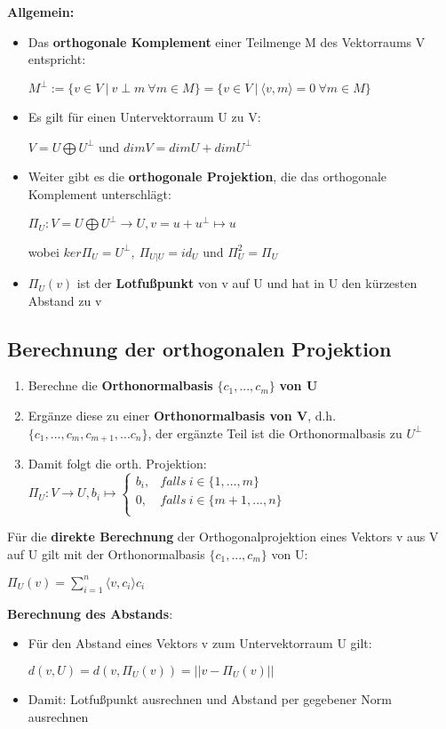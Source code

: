 \documentclass[10pt,a4paper]{article}
\begin{document}
	\textbf{Allgemein:}
	\begin{itemize}
		\item Das \textbf{orthogonale Komplement} einer Teilmenge M des Vektorraums V entspricht:
		\begin{center}
			$M^\perp := \{v \in V\ |\ v\perp m\ \forall m\in M\} = \{v\in V\ |\ \langle v, m\rangle = 0\ \forall m\in M\}$
		\end{center}
		\item Es gilt für einen Untervektorraum U zu V:
		\begin{center}
			$V = U \bigoplus U^\perp$ und $dim V = dim U + dim U^\perp$
		\end{center}
		\item Weiter gibt es die \textbf{orthogonale Projektion}, die das orthogonale Komplement unterschlägt:
		\begin{center}
			$\Pi_U: V = U \bigoplus U^\perp \rightarrow U, v = u + u^\perp \mapsto u$
		\end{center}
		wobei $ker \Pi_U = U^\perp,\ \Pi_{U|U} = id_U$ und $\Pi^2_U = \Pi_U$
		\item $\Pi_U(v)$ ist der \textbf{Lotfußpunkt} von v auf U und hat in U den kürzesten Abstand zu v
	\end{itemize}

	\newpage
	\subsection{Berechnung der orthogonalen Projektion}
	\label{os:sub:berechnung_der_orthogonalen_projektion}	
	\begin{enumerate}
		\item Berechne die \textbf{Orthonormalbasis} $\{c_1, ..., c_m\}$ \textbf{von U}
		\item Ergänze diese zu einer \textbf{Orthonormalbasis von V}, d.h. $\{c_1, ..., c_m, c_{m + 1}, ... c_n\}$, der ergänzte Teil ist die Orthonormalbasis zu $U^\perp$
		\item Damit folgt die orth. Projektion: $\Pi_U: V \rightarrow U, b_i \mapsto
		\begin{cases}
			b_i,& falls\ i \in \{1, ..., m\}\\
			0,& falls\ i \in \{m + 1, ..., n\}\\
		\end{cases}$
	\end{enumerate}
	Für die \textbf{direkte Berechnung} der Orthogonalprojektion eines Vektors v aus V auf U gilt mit der Orthonormalbasis $\{c_1, ..., c_m\}$ von U:
	\begin{center}
		$\Pi_U(v) = \sum_{i = 1}^{n} \langle v, c_i \rangle c_i$
	\end{center}
	\textbf{Berechnung des Abstands}:
	\begin{itemize}
		\item Für den Abstand eines Vektors v zum Untervektorraum U gilt:
		\begin{center}
			$d(v, U) = d(v, \Pi_U(v)) = ||v - \Pi_U(v)||$
		\end{center}
		\item Damit: Lotfußpunkt ausrechnen und Abstand per gegebener Norm ausrechnen
	\end{itemize}
\end{document}
